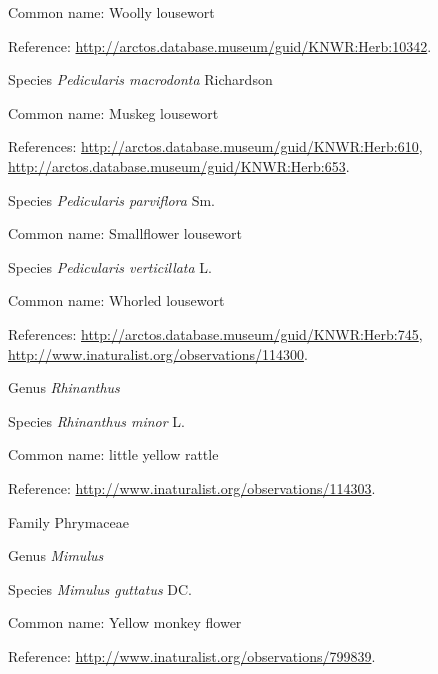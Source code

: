 \documentclass[9pt, article]{memoir}
\begin{document}
\begin{multicols}{2}
Common name: Woolly lousewort

Reference: 
\url{http://arctos.database.museum/guid/KNWR:Herb:10342}.

\vspace{6pt}\noindent\hspace{36pt}Species \textit{Pedicularis macrodonta} Richardson


Common name: Muskeg lousewort

References: 
\url{http://arctos.database.museum/guid/KNWR:Herb:610}, 
\url{http://arctos.database.museum/guid/KNWR:Herb:653}.

\vspace{6pt}\noindent\hspace{36pt}Species \textit{Pedicularis parviflora} Sm.


Common name: Smallflower lousewort

\vspace{6pt}\noindent\hspace{36pt}Species \textit{Pedicularis verticillata} L.


Common name: Whorled lousewort

References: 
\url{http://arctos.database.museum/guid/KNWR:Herb:745}, 
\url{http://www.inaturalist.org/observations/114300}.

\vspace{6pt}\noindent\hspace{30pt}Genus \textit{Rhinanthus}


\vspace{6pt}\noindent\hspace{36pt}Species \textit{Rhinanthus minor} L.


Common name: little yellow rattle

Reference: 
\url{http://www.inaturalist.org/observations/114303}.

\vspace{6pt}\noindent\hspace{24pt}Family Phrymaceae


\vspace{6pt}\noindent\hspace{30pt}Genus \textit{Mimulus}


\vspace{6pt}\noindent\hspace{36pt}Species \textit{Mimulus guttatus} DC.


Common name: Yellow monkey flower

Reference: 
\url{http://www.inaturalist.org/observations/799839}.


\end{multicols}
\end{document}
